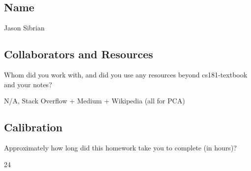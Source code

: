 \documentclass[submit]{harvardml}
\begin{document}
\newpage
\subsection*{Name}

Jason Sibrian

\subsection*{Collaborators and Resources}
Whom did you work with, and did you use any resources beyond cs181-textbook and your notes?

N/A, Stack Overflow + Medium + Wikipedia (all for PCA)

\subsection*{Calibration}
Approximately how long did this homework take you to complete (in hours)? 

24
\end{document}
